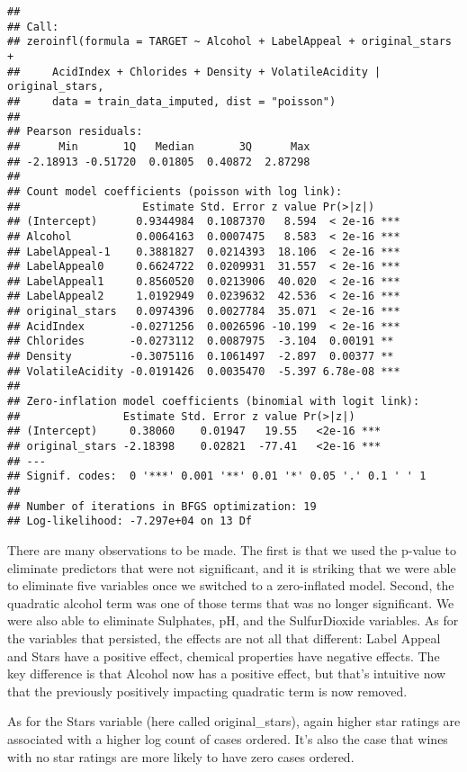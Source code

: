\documentclass[
]{article}
\begin{document}
\begin{verbatim}
## 
## Call:
## zeroinfl(formula = TARGET ~ Alcohol + LabelAppeal + original_stars + 
##     AcidIndex + Chlorides + Density + VolatileAcidity | original_stars, 
##     data = train_data_imputed, dist = "poisson")
## 
## Pearson residuals:
##      Min       1Q   Median       3Q      Max 
## -2.18913 -0.51720  0.01805  0.40872  2.87298 
## 
## Count model coefficients (poisson with log link):
##                   Estimate Std. Error z value Pr(>|z|)    
## (Intercept)      0.9344984  0.1087370   8.594  < 2e-16 ***
## Alcohol          0.0064163  0.0007475   8.583  < 2e-16 ***
## LabelAppeal-1    0.3881827  0.0214393  18.106  < 2e-16 ***
## LabelAppeal0     0.6624722  0.0209931  31.557  < 2e-16 ***
## LabelAppeal1     0.8560520  0.0213906  40.020  < 2e-16 ***
## LabelAppeal2     1.0192949  0.0239632  42.536  < 2e-16 ***
## original_stars   0.0974396  0.0027784  35.071  < 2e-16 ***
## AcidIndex       -0.0271256  0.0026596 -10.199  < 2e-16 ***
## Chlorides       -0.0273112  0.0087975  -3.104  0.00191 ** 
## Density         -0.3075116  0.1061497  -2.897  0.00377 ** 
## VolatileAcidity -0.0191426  0.0035470  -5.397 6.78e-08 ***
## 
## Zero-inflation model coefficients (binomial with logit link):
##                Estimate Std. Error z value Pr(>|z|)    
## (Intercept)     0.38060    0.01947   19.55   <2e-16 ***
## original_stars -2.18398    0.02821  -77.41   <2e-16 ***
## ---
## Signif. codes:  0 '***' 0.001 '**' 0.01 '*' 0.05 '.' 0.1 ' ' 1 
## 
## Number of iterations in BFGS optimization: 19 
## Log-likelihood: -7.297e+04 on 13 Df
\end{verbatim}

There are many observations to be made. The first is that we used the
p-value to eliminate predictors that were not significant, and it is
striking that we were able to eliminate five variables once we switched
to a zero-inflated model. Second, the quadratic alcohol term was one of
those terms that was no longer significant. We were also able to
eliminate Sulphates, pH, and the SulfurDioxide variables. As for the
variables that persisted, the effects are not all that different: Label
Appeal and Stars have a positive effect, chemical properties have
negative effects. The key difference is that Alcohol now has a positive
effect, but that's intuitive now that the previously positively
impacting quadratic term is now removed.

As for the Stars variable (here called original\_stars), again higher
star ratings are associated with a higher log count of cases ordered.
It's also the case that wines with no star ratings are more likely to
have zero cases ordered.
\end{document}
